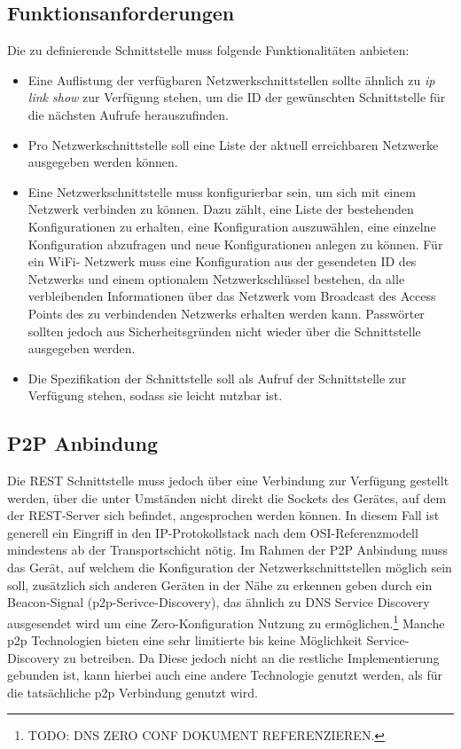 	\subsection{Funktionsanforderungen}

    Die zu definierende Schnittstelle muss folgende Funktionalitäten anbieten:
    \begin{itemize}
        \item Eine Auflistung der verfügbaren Netzwerkschnittstellen sollte ähnlich zu {\it ip link show} zur Verfügung stehen, um die ID der gewünschten Schnittstelle für die nächsten Aufrufe herauszufinden.
        \item Pro Netzwerkschnittstelle soll eine Liste der aktuell erreichbaren Netzwerke ausgegeben werden können.
        \item Eine Netzwerkschnittstelle muss konfigurierbar sein, um sich mit einem Netzwerk verbinden zu können. Dazu zählt, eine Liste der bestehenden Konfigurationen zu erhalten, eine Konfiguration auszuwählen, eine einzelne Konfiguration abzufragen und neue Konfigurationen anlegen zu können. Für ein WiFi- Netzwerk muss eine Konfiguration aus der gesendeten ID des Netzwerks und einem optionalem Netzwerkschlüssel bestehen, da alle verbleibenden Informationen über das Netzwerk vom Broadcast des Access Points des zu verbindenden Netzwerks erhalten werden kann.
        Passwörter sollten jedoch aus Sicherheitsgründen nicht wieder über die Schnittstelle ausgegeben werden.
        
        \item Die Spezifikation der Schnittstelle soll als Aufruf der Schnittstelle zur Verfügung stehen, sodass sie leicht nutzbar ist.
    \end{itemize}
    
    \subsection{P2P Anbindung}

	Die REST Schnittstelle muss jedoch über eine Verbindung zur Verfügung gestellt werden, über die unter Umständen nicht direkt die Sockets des Gerätes, auf dem der REST-Server sich befindet, angesprochen werden können. In diesem Fall ist generell ein Eingriff in den IP-Protokollstack nach dem OSI-Referenzmodell mindestens ab der Transportschicht nötig. Im Rahmen der P2P Anbindung muss das Gerät, auf welchem die Konfiguration der Netzwerkschnittstellen möglich sein soll, zusätzlich sich anderen Geräten in der Nähe zu erkennen geben durch ein Beacon-Signal (p2p-Serivce-Discovery), das ähnlich zu DNS Service Discovery ausgesendet wird um eine Zero-Konfiguration Nutzung zu ermöglichen.\footnote{TODO: DNS ZERO CONF DOKUMENT REFERENZIEREN.} Manche p2p Technologien bieten eine sehr limitierte bis keine Möglichkeit Service-Discovery zu betreiben. Da Diese jedoch nicht an die restliche Implementierung gebunden ist, kann hierbei auch eine andere Technologie genutzt werden, als für die tatsächliche p2p Verbindung genutzt wird.

